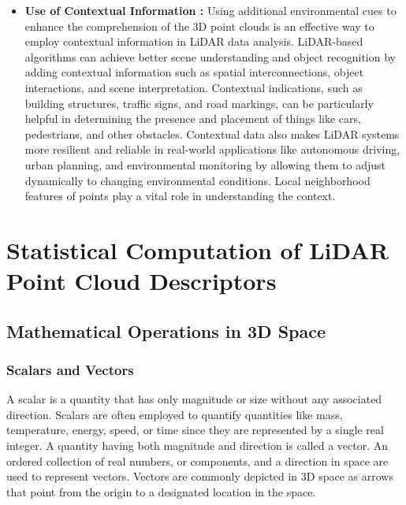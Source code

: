 \begin{itemize}
    \item \textbf{Use of Contextual Information : }
    Using additional environmental cues to enhance the comprehension of the 3D point clouds is an effective way to employ contextual information in LiDAR data analysis. LiDAR-based algorithms can achieve better scene understanding and object recognition by adding contextual information such as spatial interconnections, object interactions, and scene interpretation. Contextual indications, such as building structures, traffic signs, and road markings, can be particularly helpful in determining the presence and placement of things like cars, pedestrians, and other obstacles. Contextual data also makes LiDAR systems more resilient and reliable in real-world applications like autonomous driving, urban planning, and environmental monitoring by allowing them to adjust dynamically to changing environmental conditions. Local neighborhood features of points play a vital role in understanding the context.
\end{itemize}


\section{Statistical Computation of LiDAR Point Cloud Descriptors}
\subsection{Mathematical Operations in 3D Space}
\subsubsection{Scalars and Vectors}
A scalar is a quantity that has only magnitude or size without any associated direction. Scalars are often employed to quantify quantities like mass, temperature, energy, speed, or time since they are represented by a single real integer. A quantity having both magnitude and direction is called a vector. An ordered collection of real numbers, or components, and a direction in space are used to represent vectors. Vectors are commonly depicted in 3D space as arrows that point from the origin to a designated location in the space.


